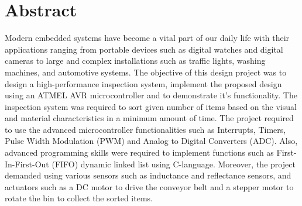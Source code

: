 \section*{Abstract}\label{sec:abstract}
	Modern embedded systems have become a vital part of our daily life with their applications ranging from portable devices such as digital watches and digital cameras to large and complex installations such as traffic lights, washing machines, and automotive systems. The objective of this design project was to design a high-performance inspection system, implement the proposed design using an ATMEL AVR microcontroller and to demonstrate it's functionality. The inspection system was required to sort given number of items based on the visual and material characteristics in a minimum amount of time. The project required to use the advanced microcontroller functionalities such as Interrupts, Timers, Pulse Width Modulation (PWM) and Analog to Digital Converters (ADC). Also, advanced programming skills were required to implement functions such as First-In-First-Out (FIFO) dynamic linked list using C-language. Moreover, the project demanded using various sensors such as inductance and reflectance sensors, and actuators such as a DC motor to drive the conveyor belt and a stepper motor to rotate the bin to collect the sorted items.